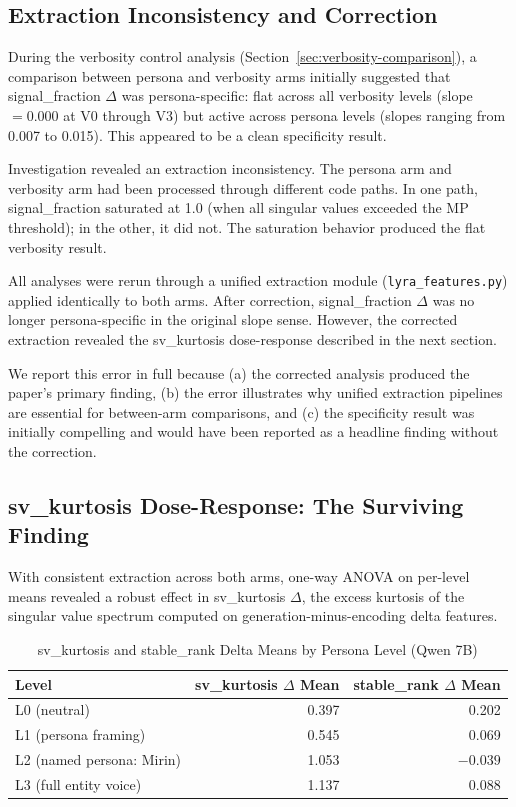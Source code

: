 \documentclass[11pt]{article}
\begin{document}
\subsection{Extraction Inconsistency and Correction}
\label{sec:extraction-inconsistency}

During the verbosity control analysis (Section~\ref{sec:verbosity-comparison}), a comparison between persona and verbosity arms initially suggested that signal\_fraction $\Delta$ was persona-specific: flat across all verbosity levels (slope $= 0.000$ at V0 through V3) but active across persona levels (slopes ranging from 0.007 to 0.015). This appeared to be a clean specificity result.

Investigation revealed an extraction inconsistency. The persona arm and verbosity arm had been processed through different code paths. In one path, signal\_fraction saturated at 1.0 (when all singular values exceeded the MP threshold); in the other, it did not. The saturation behavior produced the flat verbosity result.

All analyses were rerun through a unified extraction module (\texttt{lyra\_features.py}) applied identically to both arms. After correction, signal\_fraction $\Delta$ was no longer persona-specific in the original slope sense. However, the corrected extraction revealed the sv\_kurtosis dose-response described in the next section.

We report this error in full because (a) the corrected analysis produced the paper's primary finding, (b) the error illustrates why unified extraction pipelines are essential for between-arm comparisons, and (c) the specificity result was initially compelling and would have been reported as a headline finding without the correction.

\subsection{sv\_kurtosis Dose-Response: The Surviving Finding}
\label{sec:kurtosis-dose-response}

With consistent extraction across both arms, one-way ANOVA on per-level means revealed a robust effect in sv\_kurtosis $\Delta$, the excess kurtosis of the singular value spectrum computed on generation-minus-encoding delta features.

\begin{table}[H]
\centering
\caption{sv\_kurtosis and stable\_rank Delta Means by Persona Level (Qwen 7B)}
\label{tab:kurtosis-means}
\begin{tabular}{lrr}
\toprule
Level & sv\_kurtosis $\Delta$ Mean & stable\_rank $\Delta$ Mean \\
\midrule
L0 (neutral) & 0.397 & 0.202 \\
L1 (persona framing) & 0.545 & 0.069 \\
L2 (named persona: Mirin) & 1.053 & $-0.039$ \\
L3 (full entity voice) & 1.137 & 0.088 \\
\bottomrule
\end{tabular}
\end{table}
\end{document}
